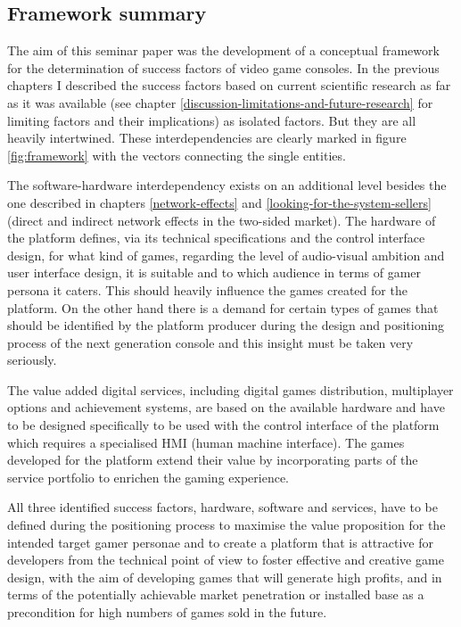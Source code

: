 \documentclass
[
    a4paper,
    11pt
]
{article}
\begin{document}
\subsection{Framework summary}
\label{framework-summary}
The aim of this seminar paper was the development of a conceptual framework
for the determination of success factors of video game consoles. In the
previous chapters I described the success factors based on current
scientific research as far as it was available (see chapter \ref{discussion-limitations-and-future-research}
for limiting factors and their implications) as isolated factors. But
they are all heavily intertwined. These interdependencies are clearly marked
in figure \ref{fig:framework} with the vectors connecting the single entities.

The software-hardware interdependency exists on an additional level besides the one
described in chapters \ref{network-effects} and \ref{looking-for-the-system-sellers}
(direct and indirect network effects in the two-sided market). The hardware
of the platform defines, via its technical specifications and the control
interface design, for what kind of games, regarding the level of audio-visual
ambition and user interface design, it is suitable and to which audience in terms of gamer persona
it caters. This should heavily influence the games created for the platform.
On the other hand there is a demand for certain types of games that should be identified by the
platform producer during the design and positioning process of the next generation console and
this insight must be taken very seriously.

The value added digital services, including digital games distribution,
multiplayer options and achievement systems, are based on the available
hardware and have to be designed specifically to be used with the control
interface of the platform which requires a specialised HMI (human machine
interface). The games developed for the platform extend their value by
incorporating parts of the service portfolio to enrichen the gaming
experience.

All three identified success factors, hardware, software and services, have to be
defined during the positioning process to maximise the value proposition for
the intended target gamer personae and to create a platform that is attractive
for developers from the technical point of view to foster effective and creative game
design, with the aim of developing games that will generate high profits, and in
terms of the potentially achievable market penetration or installed base as a
precondition for high numbers of games sold in the future.
\end{document}
